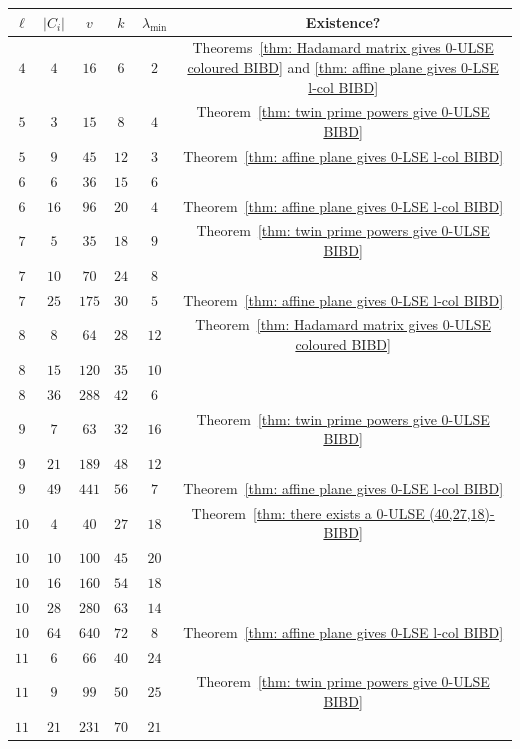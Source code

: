 \documentclass[12pt]{article}
\theoremstyle{definition}
\begin{document}
\begin{table}[p]
    \centering
    \begin{tabular}{c|c|c|c|c|c}
$\ell$ & $|C_i|$ & $v$ & $k$ & $\lambda_{\min}$ & Existence? \\ \hline
$4$ & $4$ & $16$ & $6$ & $2$ & Theorems~\ref{thm: Hadamard matrix gives 0-ULSE coloured BIBD} and \ref{thm: affine plane gives 0-LSE l-col BIBD}\\
$5$ & $3$ & $15$ & $8$ & $4$ & Theorem~\ref{thm: twin prime powers give 0-ULSE BIBD}\\
$5$ & $9$ & $45$ & $12$ & $3$ & Theorem~\ref{thm: affine plane gives 0-LSE l-col BIBD}\\
$6$ & $6$ & $36$ & $15$ & $6$ & \\
$6$ & $16$ & $96$ & $20$ & $4$ & Theorem~\ref{thm: affine plane gives 0-LSE l-col BIBD}\\
$7$ & $5$ & $35$ & $18$ & $9$ & Theorem~\ref{thm: twin prime powers give 0-ULSE BIBD}\\
$7$ & $10$ & $70$ & $24$ & $8$ & \\
$7$ & $25$ & $175$ & $30$ & $5$ & Theorem~\ref{thm: affine plane gives 0-LSE l-col BIBD}\\
$8$ & $8$ & $64$ & $28$ & $12$ & Theorem~\ref{thm: Hadamard matrix gives 0-ULSE coloured BIBD}\\
$8$ & $15$ & $120$ & $35$ & $10$ & \\
$8$ & $36$ & $288$ & $42$ & $6$ & \\
$9$ & $7$ & $63$ & $32$ & $16$ & Theorem~\ref{thm: twin prime powers give 0-ULSE BIBD}\\
$9$ & $21$ & $189$ & $48$ & $12$ & \\
$9$ & $49$ & $441$ & $56$ & $7$ & Theorem~\ref{thm: affine plane gives 0-LSE l-col BIBD}\\
$10$ & $4$ & $40$ & $27$ & $18$ & Theorem~\ref{thm: there exists a 0-ULSE (40,27,18)-BIBD}\\
$10$ & $10$ & $100$ & $45$ & $20$ & \\
$10$ & $16$ & $160$ & $54$ & $18$ & \\
$10$ & $28$ & $280$ & $63$ & $14$ & \\
$10$ & $64$ & $640$ & $72$ & $8$ & Theorem~\ref{thm: affine plane gives 0-LSE l-col BIBD}\\
$11$ & $6$ & $66$ & $40$ & $24$ & \\
$11$ & $9$ & $99$ & $50$ & $25$ & Theorem~\ref{thm: twin prime powers give 0-ULSE BIBD}\\
$11$ & $21$ & $231$ & $70$ & $21$ & \\

\end{tabular}
\end{table}
\end{document}
